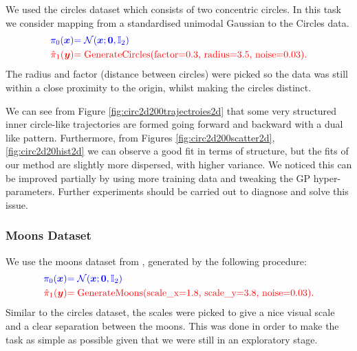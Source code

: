 \documentclass[a4paper,12pt,twoside,openright]{report}
\theoremstyle{definition}
\begin{document}
We  used the circles dataset \citep{pedregosa2011scikit} which consists of two concentric circles. In this task we consider mapping from a standardised unimodal Gaussian to the Circles data.
\begin{align*}
     \color{blue}{\pi_0({\bm{x}})} &\color{blue}{= {\mathcal{N}}({\bm{x}}; {\bm{0}},  \mathbb{I}_2)} \\
    \color{red}{\hat{\pi}_1({\bm{y}})} &\color{red}{= \text{GenerateCircles(factor=0.3, radius=3.5, noise=0.03)}}.
\end{align*}
The radius and factor (distance between circles) were picked so the data was still within a close proximity to the origin, whilst making the circles distinct.

We can see from Figure \ref{fig:circ2d200trajectroies2d} that some very structured inner circle-like trajectories are formed going forward and backward with a dual like pattern. Furthermore, from Figures \ref{fig:circ2d200scatter2d}, \ref{fig:circ2d20hist2d} we can observe a good fit in terms of structure, but the fits of our method are slightly more dispersed, with higher variance. We noticed this can be improved partially by using more training data and tweaking the GP hyper-parameters. Further experiments should be carried out to diagnose and solve this issue. 


\subsubsection{Moons Dataset}
We use the moons dataset from \cite{pedregosa2011scikit}, generated by the following procedure:
\begin{align*}
     \color{blue}{\pi_0({\bm{x}})} &\color{blue}{= {\mathcal{N}}({\bm{x}}; {\bm{0}},  \mathbb{I}_2)} \\
    \color{red}{\hat{\pi}_1({\bm{y}})} &\color{red}{= \text{GenerateMoons(scale\_x=1.8, scale\_y=3.8, noise=0.03)}}.
\end{align*}
Similar to the circles dataset, the scales were picked to give a nice visual scale and a clear separation between the moons. This was done in order to make the task as simple as possible given that we were still in an exploratory stage.
\end{document}
